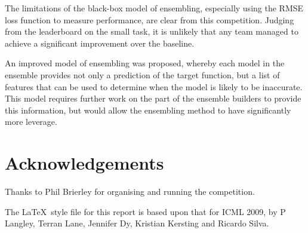 \documentclass{article}
\begin{document}
The limitations of the black-box model of ensembling, especially using the RMSE loss function to measure performance, are clear from this competition.  Judging from the leaderboard on the small task, it is unlikely that any team managed to achieve a significant improvement over the baseline.

An improved model of ensembling was proposed, whereby each model in the ensemble provides not only a prediction of the target function, but a list of features that can be used to determine when the model is likely to be inaccurate.  This model requires further work on the part of the ensemble builders to provide this information, but would allow the ensembling method to have significantly more leverage.

\section*{Acknowledgements} 

Thanks to Phil Brierley for organising and running the competition.

The \LaTeX\ style file for this report is based upon that for ICML 2009, by P Langley, Terran Lane, Jennifer Dy, Kristian Kersting and Ricardo Silva.




\end{document}
